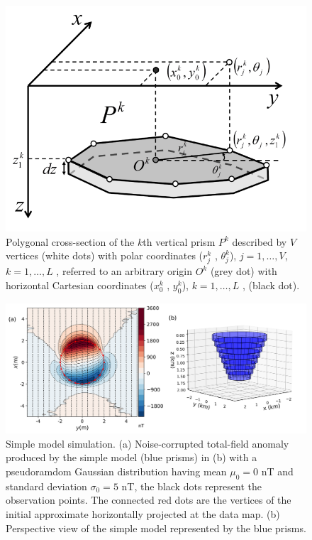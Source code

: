 \begin{figure}
    \centering
    \includegraphics[scale=0.3]{figures/prism_parameters_mod.png}
    \caption{Polygonal cross-section of the $k$th vertical prism $P^k$ described by $V$ vertices (white dots) with polar coordinates ($r^k_j$ , $\theta ^k_j$), $j = 1, \dots, V$, $k = 1, \dots, L$ , referred to an arbitrary origin $O^k$ (grey dot) with horizontal Cartesian coordinates ($x_0^k$ , $y_0^k$), $k = 1, \dots, L$ , (black dot).}
    \label{fig:prism_parameters}
\end{figure}


\begin{figure}
    \centering
    \includegraphics[width=\linewidth]{figures/simple_model_data.png}
    \caption{Simple model simulation. (a) Noise-corrupted total-field anomaly produced by the simple model (blue prisms) in (b) with a pseudoramdom Gaussian distribution having mean $\mu_0 = 0$ nT and standard deviation $\sigma_0 = 5$ nT, the black dots represent the observation points. The connected red dots are the vertices of the initial approximate horizontally projected at the data map. (b) Perspective view of the simple model represented by the blue prisms.
}
    \label{fig:simple_model}
\end{figure}

